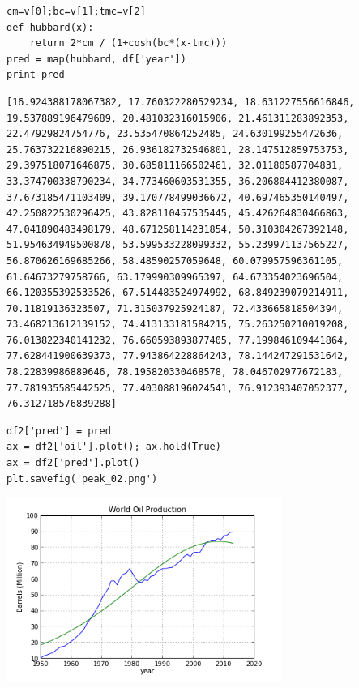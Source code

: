 \documentclass[12pt,fleqn]{article}\usepackage{../common}
\begin{document}
\begin{verbatim}
cm=v[0];bc=v[1];tmc=v[2]
def hubbard(x): 
    return 2*cm / (1+cosh(bc*(x-tmc)))
pred = map(hubbard, df['year'])
print pred
\end{verbatim}

\begin{verbatim}
[16.924388178067382, 17.760322280529234, 18.631227556616846, 19.537889196479689, 20.481032316015906, 21.461311283892353, 22.47929824754776, 23.535470864252485, 24.630199255472636, 25.763732216890215, 26.936182732546801, 28.147512859753753, 29.397518071646875, 30.685811166502461, 32.01180587704831, 33.374700338790234, 34.773460603531355, 36.206804412380087, 37.673185471103409, 39.170778499036672, 40.697465350140497, 42.250822530296425, 43.828110457535445, 45.426264830466863, 47.041890483498179, 48.671258114231854, 50.310304267392148, 51.954634949500878, 53.599533228099332, 55.239971137565227, 56.870626169685266, 58.48590257059648, 60.079957596361105, 61.64673279758766, 63.179990309965397, 64.673354023696504, 66.120355392533526, 67.514483524974992, 68.849239079214911, 70.11819136323507, 71.315037925924187, 72.433665818504394, 73.468213612139152, 74.413133181584215, 75.263250210019208, 76.013822340141232, 76.660593893877405, 77.199846109441864, 77.628441900639373, 77.943864228864243, 78.144247291531642, 78.22839986889646, 78.195820330468578, 78.046702977672183, 77.781935585442525, 77.403088196024541, 76.912393407052377, 76.312718576839288]
\end{verbatim}

\begin{verbatim}
df2['pred'] = pred
ax = df2['oil'].plot(); ax.hold(True)
ax = df2['pred'].plot()
plt.savefig('peak_02.png')
\end{verbatim}

\includegraphics[height=6cm]{peak_02.png}
\end{document}

